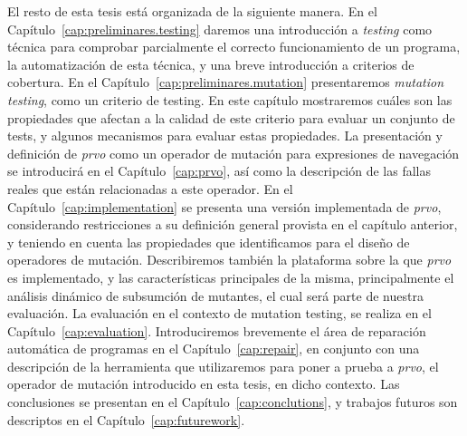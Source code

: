 El resto de esta tesis est\'a organizada de la siguiente manera. En el Cap\'itulo~\ref{cap:preliminares.testing} daremos una introducci\'on a \emph{testing} como t\'ecnica para comprobar parcialmente el correcto funcionamiento de un programa, la automatizaci\'on de esta t\'ecnica, y una breve introducci\'on a criterios de cobertura. En el Cap\'itulo~\ref{cap:preliminares.mutation} presentaremos \emph{mutation testing}, como un criterio de testing. En este cap\'itulo mostraremos cu\'ales son las propiedades que afectan a la calidad de este criterio para evaluar un conjunto de tests, y algunos mecanismos para evaluar estas propiedades. La presentaci\'on y definici\'on de \emph{prvo} como un operador de mutaci\'on para expresiones de navegaci\'on se introducir\'a en el Cap\'itulo~\ref{cap:prvo}, as\'i como la descripci\'on de las fallas reales que est\'an relacionadas a este operador. En el Cap\'itulo~\ref{cap:implementation} se presenta una versi\'on implementada de \emph{prvo}, considerando restricciones a su definici\'on general provista en el cap\'itulo anterior, y teniendo en cuenta las propiedades que identificamos para el dise\~no de operadores de mutaci\'on. Describiremos tambi\'en la plataforma sobre la que \emph{prvo} es implementado, y las caracter\'isticas principales de la misma, principalmente el an\'alisis din\'amico de subsumci\'on de mutantes, el cual ser\'a parte de nuestra evaluaci\'on. La evaluaci\'on en el contexto de mutation testing, se realiza en el Cap\'itulo~\ref{cap:evaluation}. Introduciremos brevemente el \'area de reparaci\'on autom\'atica de programas en el Cap\'itulo~\ref{cap:repair}, en conjunto con una descripci\'on de la herramienta que utilizaremos para poner a prueba a \emph{prvo}, el operador de mutaci\'on introducido en esta tesis, en dicho contexto. Las conclusiones se presentan en el Cap\'itulo~\ref{cap:conclutions}, y trabajos futuros son descriptos en el Cap\'itulo~\ref{cap:futurework}.

